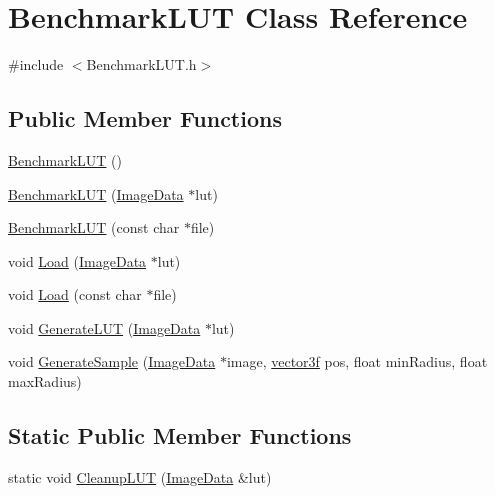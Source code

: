 \hypertarget{class_benchmark_l_u_t}{}\section{Benchmark\+L\+UT Class Reference}
\label{class_benchmark_l_u_t}


{\ttfamily \#include $<$Benchmark\+L\+U\+T.\+h$>$}

\subsection*{Public Member Functions}
\begin{DoxyCompactItemize}
\item 
\hyperlink{class_benchmark_l_u_t_a4cc66179032674a228cc5245ced451f7}{Benchmark\+L\+UT} ()
\item 
\hyperlink{class_benchmark_l_u_t_a1ac0338c2339b5590ae51e15ad528dcb}{Benchmark\+L\+UT} (\hyperlink{_queued_tracker_8h_a2d6726594ce64e82b9222b183f2571d1}{Image\+Data} $\ast$lut)
\item 
\hyperlink{class_benchmark_l_u_t_a83492c3b8f6966a377a705ed74dc7721}{Benchmark\+L\+UT} (const char $\ast$file)
\item 
void \hyperlink{class_benchmark_l_u_t_a1ab15013a6b6883a134a5ed14ca89341}{Load} (\hyperlink{_queued_tracker_8h_a2d6726594ce64e82b9222b183f2571d1}{Image\+Data} $\ast$lut)
\item 
void \hyperlink{class_benchmark_l_u_t_a8e7f2872ae37a4e0522ce8de7361dbdf}{Load} (const char $\ast$file)
\item 
void \hyperlink{class_benchmark_l_u_t_a25aa2a5d399a7c69ce755ee41384558a}{Generate\+L\+UT} (\hyperlink{_queued_tracker_8h_a2d6726594ce64e82b9222b183f2571d1}{Image\+Data} $\ast$lut)
\item 
void \hyperlink{class_benchmark_l_u_t_ac2994fc6e33a4340057793a7d020a117}{Generate\+Sample} (\hyperlink{_queued_tracker_8h_a2d6726594ce64e82b9222b183f2571d1}{Image\+Data} $\ast$image, \hyperlink{std__incl_8h_a2feaef1d85a74bd5cf80df91b1a9a914}{vector3f} pos, float min\+Radius, float max\+Radius)
\end{DoxyCompactItemize}
\subsection*{Static Public Member Functions}
\begin{DoxyCompactItemize}
\item 
static void \hyperlink{class_benchmark_l_u_t_a0603ca70a5218b22809d9956ef226905}{Cleanup\+L\+UT} (\hyperlink{_queued_tracker_8h_a2d6726594ce64e82b9222b183f2571d1}{Image\+Data} \&lut)
\end{DoxyCompactItemize}
